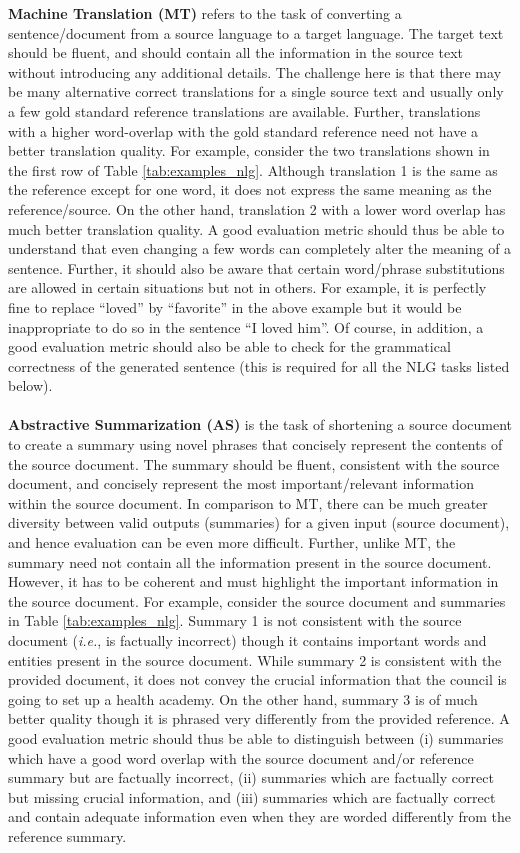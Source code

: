 \textbf{Machine Translation (MT)} refers to the task of converting a sentence/document from a source language to a target language. The target text should be fluent, and should contain all the information in the source text without introducing any additional details. The challenge here is that there may be many alternative correct translations for a single source text and usually only a few gold standard reference translations are available. Further, translations with a higher word-overlap with the gold standard reference need not have a better translation quality. For example, consider the two translations shown in the first row of Table \ref{tab:examples_nlg}. Although translation 1 is the same as the reference except for one word, it does not express the same meaning as the reference/source. On the other hand, translation 2 with a lower word overlap has much better translation quality. A good evaluation metric should thus be able to understand that even changing a few words can completely alter the meaning of a sentence. Further, it should also be aware that certain word/phrase substitutions are allowed in certain situations but not in others. For example, it is perfectly fine to replace ``loved'' by ``favorite'' in the above example but it would be inappropriate to do so in the sentence ``I loved him''. Of course, in addition, a good evaluation metric should also be able to check for the grammatical correctness of the generated sentence (this is required for all the NLG tasks listed below).
\\\\
\textbf{Abstractive Summarization (AS)} is the task of shortening a source document to create a summary using novel phrases that concisely represent the contents of the source document. The summary should be fluent, consistent with the source document, and concisely represent the most important/relevant information within the source document. In comparison to MT, there can be much greater diversity between valid outputs (summaries) for a given input (source document), and hence evaluation can be even more difficult. Further, unlike MT, the summary need not contain all the information present in the source document. However, it has to be coherent and must highlight the important information in the source document. For example, consider the source document and summaries in Table \ref{tab:examples_nlg}. Summary 1 is not consistent with the source document (\textit{i.e.}, is factually incorrect) though it contains important words and entities present in the source document. While summary 2 is consistent with the provided document, it does not convey the crucial information that the council is going to set up a health academy. On the other hand, summary 3 is of much better quality though it is phrased very differently from the provided reference. A good evaluation metric should thus be able to distinguish between (i) summaries which have a good word overlap with the source document and/or reference summary but are factually incorrect, (ii) summaries which are factually correct but missing crucial information, and (iii) summaries which are factually correct and contain adequate information even when they are worded differently from the reference summary. 
